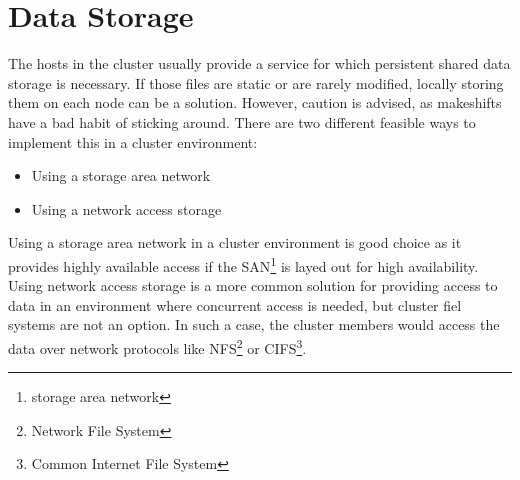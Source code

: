 
\section{Data Storage}

The hosts in the cluster usually provide a service for which persistent shared data storage is necessary.
If those files are static or are rarely modified, locally storing them on each node can be a solution. However, caution is advised, as makeshifts have a bad habit of sticking around.
There are two different feasible ways to implement this in a cluster environment:
\begin{itemize}
\item Using a storage area network
\item Using a network access storage
\end{itemize}

Using a storage area network in a cluster environment is good choice as it provides highly available access if the SAN\footnote{storage area network} is layed out for high availability.
Using network access storage is a more common solution for providing access to data in an environment where concurrent access is needed, but cluster fiel systems are not an option. In such a case, the cluster members would access the data over network protocols like NFS\footnote{Network File System} or CIFS\footnote{Common Internet File System}.